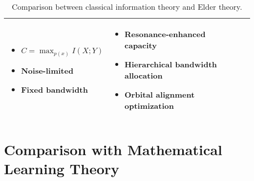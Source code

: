\begin{table}[h]
\begin{tabular}{|p{3cm}|p{5cm}|p{5cm}|}
\begin{itemize}
    \item $C = \max_{p(x)} I(X;Y)$
    \item Noise-limited
    \item Fixed bandwidth
\end{itemize} &
\begin{itemize}
    \item Resonance-enhanced capacity
    \item Hierarchical bandwidth allocation
    \item Orbital alignment optimization
\end{itemize} \\
\hline
\end{tabular}
\caption{Comparison between classical information theory and Elder theory.}
\label{tab:information_comparison}
\end{table}

\section{Comparison with Mathematical Learning Theory}

